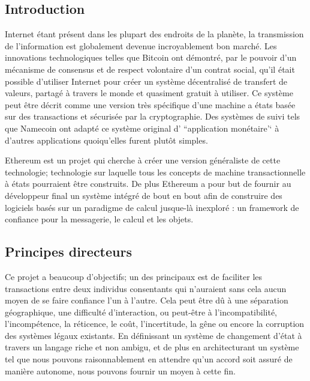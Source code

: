 \documentclass[9pt,oneside]{amsart}
\begin{document}
\setlength{\columnsep}{20pt}
\begin{multicols}{2}

\section{Introduction}\label{sec:introduction}

Internet étant présent dans les plupart des endroits de la planète, la transmission de l'information est globalement devenue incroyablement bon marché. Les innovations technologiques telles que Bitcoin ont démontré, par le pouvoir d'un mécanisme de consensus et de respect volontaire d'un contrat social, qu'il était possible d'utiliser Internet pour créer un système décentralisé de transfert de valeurs, partagé à travers le monde et quasiment gratuit à utiliser. Ce système peut être décrit comme une version très spécifique d'une machine a états basée sur des transactions et sécurisée par la cryptographie. Des systèmes de suivi tels que Namecoin ont adapté ce système original d' ``application monétaire’‘  à d'autres applications quoiqu’elles furent plutôt simples.

Ethereum est un projet qui cherche à créer une version généraliste de cette technologie; technologie sur laquelle tous les concepts de machine transactionnelle à états pourraient être construits. De plus Ethereum a pour but de fournir au développeur final un système intégré de bout en bout afin de construire des logiciels basés sur un paradigme de calcul jusque-là inexploré : un framework de confiance pour la messagerie, le calcul et les objets.

\subsection{Principes directeurs} \label{ch:driving}

Ce projet a beaucoup d’objectifs; un des principaux est de faciliter les transactions entre deux individus consentants qui n'auraient sans cela aucun moyen de se faire confiance l'un à l'autre. Cela peut être dû à une séparation géographique, une difficulté d'interaction, ou peut-être à l'incompatibilité, l'incompétence, la réticence, le coût, l'incertitude, la gêne ou encore la corruption des systèmes légaux existants. En définissant un système de changement d'état à travers un langage riche et non ambigu, et de plus en architecturant un système tel que nous pouvons raisonnablement en attendre qu'un accord soit assuré de manière autonome, nous pouvons fournir un moyen à cette fin.


\end{multicols}
\end{document}
